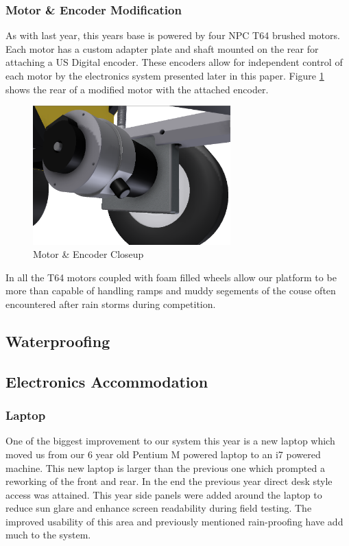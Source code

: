 \subsubsection{Motor \& Encoder Modification}
As with last year, this years base is powered by four NPC T64 brushed motors. Each motor has a custom adapter plate and shaft mounted on the rear for attaching a US Digital encoder. These encoders allow for independent control of each motor by the electronics system presented later in this paper. Figure \ref{FIG:motorencoder} shows the rear of a modified motor with the attached encoder.

\begin{figure}[H]
\begin{center}
\includegraphics[width=3in]{./pics/encodermotor.png}
\caption{Motor \& Encoder Closeup}
\label{FIG:motorencoder}
\end{center}
\end{figure}

In all the T64 motors coupled with foam filled wheels allow our platform to be more than capable of handling ramps and muddy segements of the couse often encountered after rain storms during competition. 

\subsection{Waterproofing}

\subsection{Electronics Accommodation}
\subsubsection{Laptop}
One of the biggest improvement to our system this year is a new laptop which moved us from our 6 year old Pentium M powered laptop to an i7 powered machine. This new laptop is larger than the previous one which prompted a reworking of the front and rear. In the end the previous year direct desk style access was attained. This year side panels were added around the laptop to reduce sun glare and enhance screen readability during field testing. The improved usability of this area and previously mentioned rain-proofing have add much to the system.

